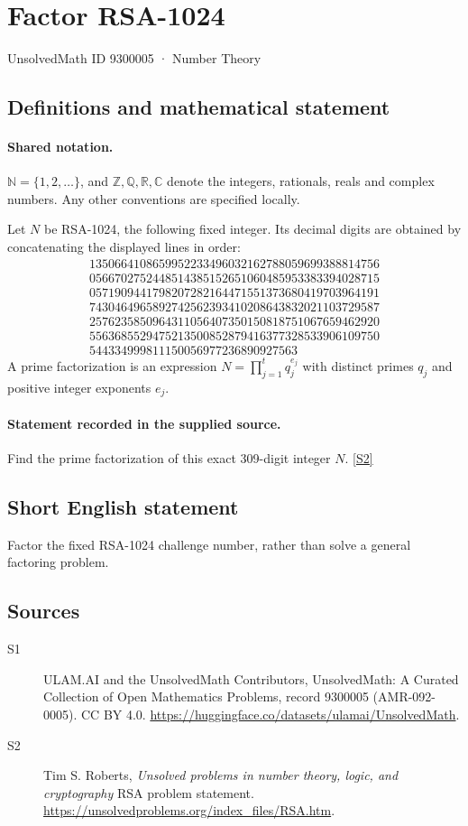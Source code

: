 \documentclass[11pt]{article}
\newcommand{\sref}[2]{\hyperlink{source:#1:#2}{[S#2]}}
\begin{document}
\setcounter{section}{9300004}
\section{Factor RSA-1024}\label{9300005}
{\small\sffamily UnsolvedMath ID 9300005 · Number Theory}
\subsection{Definitions and mathematical statement}

\paragraph{Shared notation.}$\mathbb N=\{1,2,\ldots\}$, and $\mathbb Z,\mathbb Q,\mathbb R,\mathbb C$ denote the integers, rationals, reals and complex numbers. Any other conventions are specified locally.


Let $N$ be RSA-1024, the following fixed integer. Its decimal digits are obtained by concatenating the displayed lines in order:
\[\begin{gathered}
1350664108659952233496032162788059699388814756\\
0566702752448514385152651060485953383394028715\\
0571909441798207282164471551373680419703964191\\
7430464965892742562393410208643832021103729587\\
2576235850964311056407350150818751067659462920\\
5563685529475213500852879416377328533906109750\\
544334999811150056977236890927563
\end{gathered}\]
A prime factorization is an expression $N=\prod_{j=1}^{t}q_j^{e_j}$ with distinct primes $q_j$ and positive integer exponents $e_j$.
\paragraph{Statement recorded in the supplied source.}
Find the prime factorization of this exact 309-digit integer $N$. \sref{9300005}{2}
\subsection{Short English statement}
Factor the fixed RSA-1024 challenge number, rather than solve a general factoring problem.
\subsection{Sources}
\begin{description}
\item[\hypertarget{source:9300005:1}{S1}] ULAM.AI and the UnsolvedMath Contributors, UnsolvedMath: A Curated Collection of Open Mathematics Problems, record 9300005 (AMR-092-0005). CC BY 4.0. \url{https://huggingface.co/datasets/ulamai/UnsolvedMath}.
\item[\hypertarget{source:9300005:2}{S2}] Tim S. Roberts, \emph{Unsolved problems in number theory, logic, and cryptography} RSA problem statement. \url{https://unsolvedproblems.org/index_files/RSA.htm}.
\end{description}
\label{end:9300005}
\end{document}
